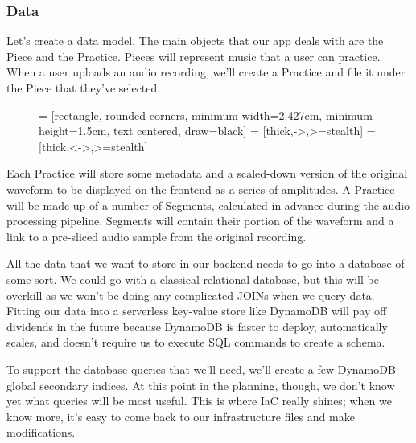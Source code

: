 \documentclass{article}
\begin{document}
\subsubsection{Data}

Let's create a data model.
The main objects that our app deals with are the Piece and the Practice.
Pieces will represent music that a user can practice.
When a user uploads an audio recording, we'll create a Practice and file it under the Piece that they've selected.

\begin{figure}[h]
  \centering
   = [rectangle, rounded corners, minimum width=2.427cm, minimum height=1.5cm, text centered, draw=black]
   = [thick,->,>=stealth]
   = [thick,<->,>=stealth]
  \label{fig:sdl}
\end{figure}

Each Practice will store some metadata and a scaled-down version of the original waveform to be displayed on the frontend as a series of amplitudes.
A Practice will be made up of a number of Segments, calculated in advance during the audio processing pipeline.
Segments will contain their portion of the waveform and a link to a pre-sliced audio sample from the original recording.

All the data that we want to store in our backend needs to go into a database of some sort.
We could go with a classical relational database, but this will be overkill as we won't be doing any complicated JOINs when we query data.
Fitting our data into a serverless key-value store like DynamoDB will pay off dividends in the future because DynamoDB is faster to deploy, automatically scales, and doesn't require us to execute SQL commands to create a schema.

To support the database queries that we'll need, we'll create a few DynamoDB global secondary indices.
At this point in the planning, though, we don't know yet what queries will be most useful.
This is where IaC really shines; when we know more, it's easy to come back to our infrastructure files and make modifications.
\end{document}
